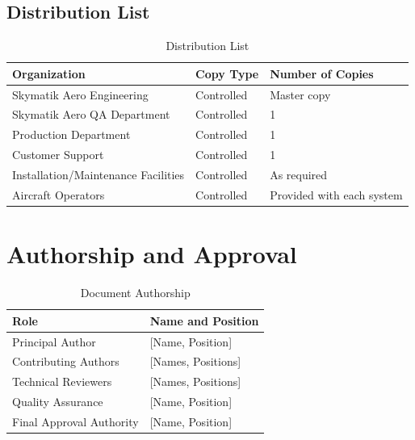 \documentclass[12pt,a4paper,twoside,openright]{book}
\newcommand{\tabletextfont}{\normalfont\rmfamily}
\newcommand{\tableheadfont}{\normalfont\bfseries}
\begin{document}
\subsection{Distribution List}

\begin{table}[h]
\centering
\setlength{\tabcolsep}{5pt} %
\begin{tabular}{|p{}|p{}|p{}|}
\hline
\tableheadfont\textbf{Organization} & \tableheadfont\textbf{Copy Type} & \tableheadfont\textbf{Number of Copies} \\
\hline
\tabletextfont Skymatik Aero Engineering & Controlled & Master copy \\
\hline
\tabletextfont Skymatik Aero QA Department & Controlled & 1 \\
\hline
\tabletextfont Production Department & Controlled & 1 \\
\hline
\tabletextfont Customer Support & Controlled & 1 \\
\hline
\tabletextfont Installation/Maintenance Facilities & Controlled & As required \\
\hline
\tabletextfont Aircraft Operators & Controlled & Provided with each system \\
\hline
\end{tabular}
\caption{Distribution List}
\end{table}

\section{Authorship and Approval}

\begin{table}[h]
\centering
\setlength{\tabcolsep}{5pt} %
\begin{tabular}{|p{}|p{}|}
\hline
\tableheadfont\textbf{Role} & \tableheadfont\textbf{Name and Position} \\
\hline
\tabletextfont Principal Author & {\color{missingred}[Name, Position]} \\
\hline
\tabletextfont Contributing Authors & {\color{missingred}[Names, Positions]} \\
\hline
\tabletextfont Technical Reviewers & {\color{missingred}[Names, Positions]} \\
\hline
\tabletextfont Quality Assurance & {\color{missingred}[Name, Position]} \\
\hline
\tabletextfont Final Approval Authority & {\color{missingred}[Name, Position]} \\
\hline
\end{tabular}
\caption{Document Authorship}
\end{table}
\end{document}
